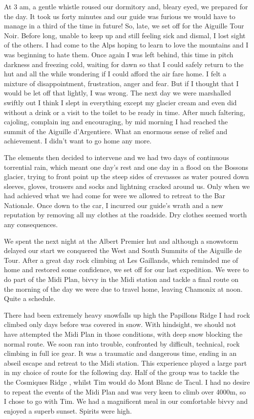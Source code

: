 \documentclass[a5paper,openany,font 10pt]{scrbook}
\begin{document}
At 3 am, a gentle whistle roused our dormitory and,
bleary eyed, we prepared for the day. It took us forty minutes and our
guide was furious   we would have to manage in a third of the
time in future! So, late, we set off for the Aiguille Tour Noir.
Before long, unable to keep up and still feeling sick and dismal,
I lost sight of the others. I had come to the Alps hoping to
learn to love the mountains and I was beginning to hate them.
Once again I was left behind, this time in pitch darkness and
freezing cold, waiting for dawn so that I could safely return to
the hut and all the while wondering if I could afford the air
fare home. I felt a mixture of disappointment, frustration, anger
and fear. But if I thought that I would be let off that lightly,
I was wrong. The next day we were marshalled swiftly out   I
think I slept in everything except my glacier cream   and even
did without a drink or a visit to the toilet to be ready in time.
After much faltering, cajoling, complain ing and encouraging, by
mid morning I had reached the summit of the Aiguille
d'Argentiere. What an enormous sense of relief and achievement. I
didn't want to go home any more.

The elements then decided to intervene and we had two days
of continuous torrential rain, which meant one day's rest and one
day in a flood on the Bossons glacier, trying to front point up
the steep sides of crevasses as water poured down sleeves,
gloves, trousers and socks and lightning cracked around us. Only
when we had achieved what we had come for were we allowed to
retreat to the Bar Nationale. Once down to the car, I incurred
our guide's wrath and a new reputation by removing all my clothes
at the roadside. Dry clothes seemed worth any consequences.

We spent the next night at the Albert Premier hut and
although a snowstorm delayed our start we conquered the West and
South Summits of the Aiguille de Tour. After a great day rock
climbing at Les Gaillands, which reminded me of home and restored
some confidence, we set off for our last expedition. We were to
do part of the Midi Plan, bivvy in the Midi station and tackle a
final route on the morning of the day we were due to travel home,
leaving Chamonix at noon. Quite a schedule.

There had been extremely heavy snowfalls up high   the
 Papillons Ridge  I had rock climbed only days before was covered
in snow. With hindsight, we should not have attempted the Midi Plan
in those conditions, with deep snow blocking the normal
route. We soon ran into trouble, confronted by difficult,
technical, rock climbing in full ice gear. It was a traumatic and
dangerous time, ending in an abseil escape and retreat to the
Midi station. This experience played a large part in my choice of
route for the following day. Half of the group was to tackle the
the Cosmiques Ridge , whilst Tim would do Mont Blanc de Tacul. I had
no desire to repeat the events of the Midi Plan and was very keen
to climb over 4000m, so I chose to go with Tim. We had a
magnificent meal in our comfortable bivvy and enjoyed a superb
sunset. Spirits were high.
\end{document}
